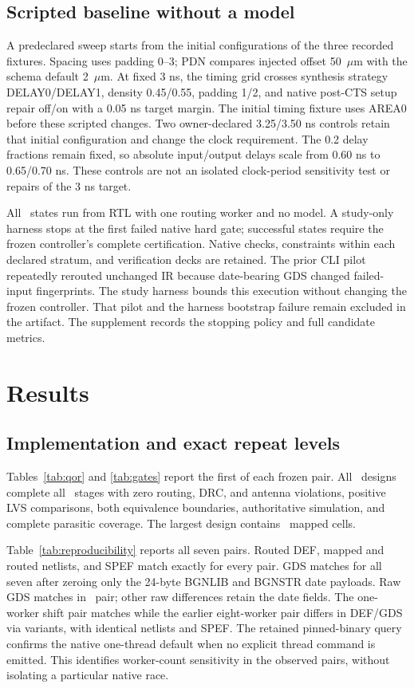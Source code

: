 \documentclass[runningheads]{llncs}
\begin{document}
\subsection{Scripted baseline without a model}
A predeclared sweep starts from the initial configurations of the three
recorded fixtures. Spacing uses padding 0--3; PDN compares injected offset
50~$\mu$m with the schema default 2~$\mu$m. At fixed 3 ns, the timing grid
crosses synthesis strategy DELAY0/DELAY1, density 0.45/0.55, padding 1/2,
and native post-CTS setup repair off/on with a 0.05 ns target margin.
The initial timing fixture uses AREA0 before these scripted changes.
Two owner-declared 3.25/3.50 ns controls retain that initial configuration
and change the clock requirement. The 0.2 delay fractions remain fixed, so
absolute input/output delays scale from 0.60 ns to 0.65/0.70 ns. These controls
are not an isolated clock-period sensitivity test or repairs of the 3 ns target.

All \ScriptedStates\ states run from RTL with one routing worker and no model.
A study-only harness stops at the first failed native hard gate; successful
states require the frozen controller's complete certification. Native checks,
constraints within each declared stratum, and verification decks are retained.
The prior CLI pilot repeatedly rerouted unchanged IR because date-bearing
GDS changed failed-input fingerprints. The study harness bounds this execution
without changing the frozen controller. That pilot and the harness bootstrap
failure remain excluded in the artifact. The supplement records the stopping policy and full candidate metrics.

\section{Results}
\subsection{Implementation and exact repeat levels}
Tables~\ref{tab:qor} and \ref{tab:gates} report the first of each frozen pair.
All \DesignCount\ designs complete all \StageCount\ stages with zero routing,
DRC, and antenna violations, positive LVS comparisons, both equivalence
boundaries, authoritative simulation, and complete parasitic coverage.
The largest design contains \CellMax\ mapped cells.



Table~\ref{tab:reproducibility} reports all seven pairs. Routed DEF, mapped
and routed netlists, and SPEF match exactly for every pair. GDS matches for
all seven after zeroing only the 24-byte BGNLIB and BGNSTR date payloads.
Raw GDS matches in \FrozenRawGDSPairs\ pair; other raw differences retain the
date fields. The one-worker shift pair matches while the earlier eight-worker
pair differs in DEF/GDS via variants, with identical netlists and SPEF.
The retained pinned-binary query confirms the native one-thread default when
no explicit thread command is emitted. This identifies worker-count
sensitivity in the observed pairs, without isolating a particular native race.

\end{document}
